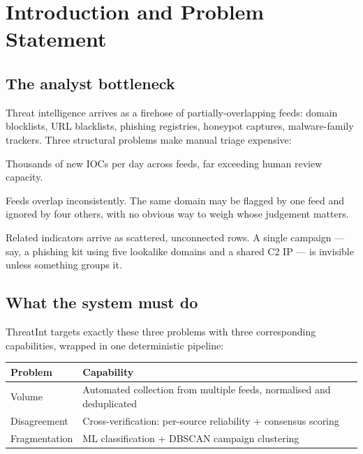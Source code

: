 \documentclass[11pt,a4paper]{article}
\begin{document}
\section{Introduction and Problem Statement}

\subsection{The analyst bottleneck}
Threat intelligence arrives as a firehose of partially-overlapping feeds:
domain blocklists, URL blacklists, phishing registries, honeypot captures,
malware-family trackers. Three structural problems make manual triage
expensive:

\begin{description}[leftmargin=1.2em,itemsep=3pt]
  \item[Volume] Thousands of new IOCs per day across feeds, far exceeding
    human review capacity.
  \item[Disagreement] Feeds overlap inconsistently. The same domain may be
    flagged by one feed and ignored by four others, with no obvious way to
    weigh whose judgement matters.
  \item[Fragmentation] Related indicators arrive as scattered, unconnected
    rows. A single campaign --- say, a phishing kit using five lookalike
    domains and a shared C2 IP --- is invisible unless something groups it.
\end{description}

\subsection{What the system must do}
ThreatInt targets exactly these three problems with three corresponding
capabilities, wrapped in one deterministic pipeline:

\begin{center}
\begin{tabularx}{\linewidth}{@{}>{\raggedright\arraybackslash}p{4.3cm}X@{}}
\toprule
\rowcolor{paper}\textbf{Problem} & \textbf{Capability} \\
\midrule
Volume & Automated collection from multiple feeds, normalised and deduplicated \\
Disagreement & Cross-verification: per-source reliability + consensus scoring \\
Fragmentation & ML classification + DBSCAN campaign clustering \\
\bottomrule
\end{tabularx}
\end{center}
\end{document}
